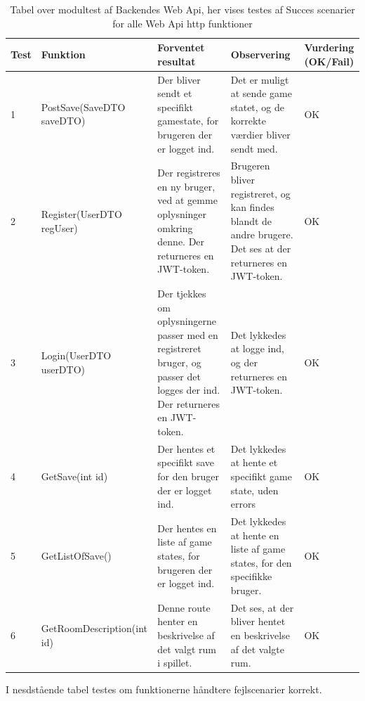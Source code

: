 \begin{table}[H]
\caption{Tabel over modultest af Backendes Web Api, her vises testes af Succes scenarier for alle Web Api http funktioner }%
\begin{tabular}{|p{0.75cm}|p{3.6cm}|p{3.5cm}|p{3.5cm}|p{1.9cm}|} \hline
 \textbf{Test} & \textbf{Funktion} & \textbf{Forventet resultat} & \textbf{Observering} & \textbf{Vurdering} \textbf{(OK/Fail)}\\\hline
 1 & PostSave(SaveDTO saveDTO) & Der bliver sendt et specifikt gamestate, for brugeren der er logget ind. & Det er muligt at sende game statet, og de korrekte værdier bliver sendt med. & OK \\ \hline
 2 & Register(UserDTO regUser) & Der registreres en ny bruger, ved at gemme oplysninger omkring denne. Der returneres en JWT-token. & Brugeren bliver registreret, og kan findes blandt de andre brugere. Det ses at der returneres en JWT-token. & OK \\ \hline
 3 & Login(UserDTO userDTO) & Der tjekkes om oplysningerne passer med en registreret bruger, og passer det logges der ind. Der returneres en JWT-token. & Det lykkedes at logge ind, og der returneres en JWT-token.  & OK \\ \hline
 4 & GetSave(int id) & Der hentes et specifikt save for den bruger der er logget ind. & Det lykkedes at hente et specifikt game state, uden errors  & OK \\ \hline
 5 & GetListOfSave() & Der hentes en liste af game states, for brugeren der er logget ind. & Det lykkedes at hente en liste af game states, for den specifikke bruger. & OK \\ \hline
 6 & GetRoomDescription(int id) & Denne route henter en beskrivelse af det valgt rum i spillet. & Det ses, at der bliver hentet en beskrivelse af det valgte rum. & OK \\ \hline
\end{tabular}
\end{table}

I nesdstående tabel testes om funktionerne håndtere fejlscenarier korrekt.

